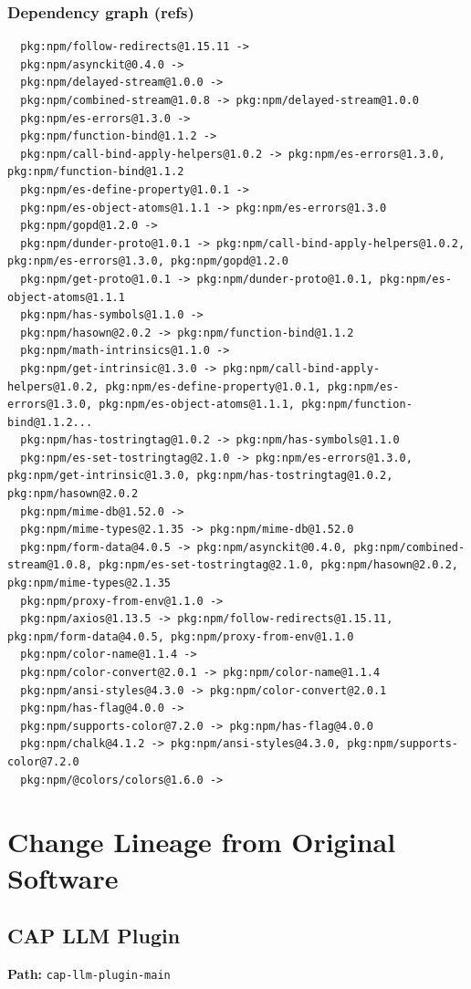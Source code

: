\documentclass[11pt]{article}
\begin{document}
\subsubsection*{Dependency graph (refs)}
\begin{verbatim}
  pkg:npm/follow-redirects@1.15.11 -> 
  pkg:npm/asynckit@0.4.0 -> 
  pkg:npm/delayed-stream@1.0.0 -> 
  pkg:npm/combined-stream@1.0.8 -> pkg:npm/delayed-stream@1.0.0
  pkg:npm/es-errors@1.3.0 -> 
  pkg:npm/function-bind@1.1.2 -> 
  pkg:npm/call-bind-apply-helpers@1.0.2 -> pkg:npm/es-errors@1.3.0, pkg:npm/function-bind@1.1.2
  pkg:npm/es-define-property@1.0.1 -> 
  pkg:npm/es-object-atoms@1.1.1 -> pkg:npm/es-errors@1.3.0
  pkg:npm/gopd@1.2.0 -> 
  pkg:npm/dunder-proto@1.0.1 -> pkg:npm/call-bind-apply-helpers@1.0.2, pkg:npm/es-errors@1.3.0, pkg:npm/gopd@1.2.0
  pkg:npm/get-proto@1.0.1 -> pkg:npm/dunder-proto@1.0.1, pkg:npm/es-object-atoms@1.1.1
  pkg:npm/has-symbols@1.1.0 -> 
  pkg:npm/hasown@2.0.2 -> pkg:npm/function-bind@1.1.2
  pkg:npm/math-intrinsics@1.1.0 -> 
  pkg:npm/get-intrinsic@1.3.0 -> pkg:npm/call-bind-apply-helpers@1.0.2, pkg:npm/es-define-property@1.0.1, pkg:npm/es-errors@1.3.0, pkg:npm/es-object-atoms@1.1.1, pkg:npm/function-bind@1.1.2...
  pkg:npm/has-tostringtag@1.0.2 -> pkg:npm/has-symbols@1.1.0
  pkg:npm/es-set-tostringtag@2.1.0 -> pkg:npm/es-errors@1.3.0, pkg:npm/get-intrinsic@1.3.0, pkg:npm/has-tostringtag@1.0.2, pkg:npm/hasown@2.0.2
  pkg:npm/mime-db@1.52.0 -> 
  pkg:npm/mime-types@2.1.35 -> pkg:npm/mime-db@1.52.0
  pkg:npm/form-data@4.0.5 -> pkg:npm/asynckit@0.4.0, pkg:npm/combined-stream@1.0.8, pkg:npm/es-set-tostringtag@2.1.0, pkg:npm/hasown@2.0.2, pkg:npm/mime-types@2.1.35
  pkg:npm/proxy-from-env@1.1.0 -> 
  pkg:npm/axios@1.13.5 -> pkg:npm/follow-redirects@1.15.11, pkg:npm/form-data@4.0.5, pkg:npm/proxy-from-env@1.1.0
  pkg:npm/color-name@1.1.4 -> 
  pkg:npm/color-convert@2.0.1 -> pkg:npm/color-name@1.1.4
  pkg:npm/ansi-styles@4.3.0 -> pkg:npm/color-convert@2.0.1
  pkg:npm/has-flag@4.0.0 -> 
  pkg:npm/supports-color@7.2.0 -> pkg:npm/has-flag@4.0.0
  pkg:npm/chalk@4.1.2 -> pkg:npm/ansi-styles@4.3.0, pkg:npm/supports-color@7.2.0
  pkg:npm/@colors/colors@1.6.0 -> 
\end{verbatim}

\newpage
\section{Change Lineage from Original Software}

\subsection{CAP LLM Plugin}
\textbf{Path:} \texttt{cap-llm-plugin-main}
\end{document}
